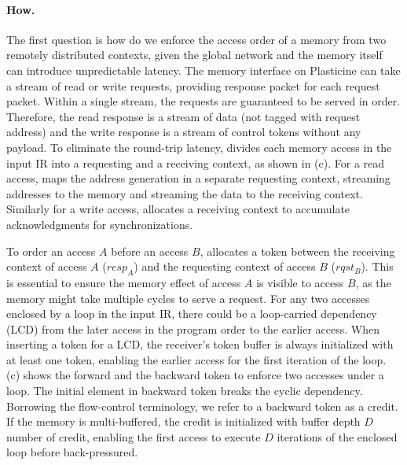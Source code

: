 
\paragraph{How.} 
The first question is how do we enforce the access order of a memory from two remotely distributed contexts, given the
global network and the memory itself can introduce unpredictable latency.
The memory interface on Plasticine can take a stream of read or write requests, providing response
packet for each request packet.
Within a single stream, the requests are guaranteed to be served in order. 
Therefore, the read response is a stream of data (not tagged with request address) and the write 
response is a stream of control tokens without any payload.
To eliminate the round-trip latency, \name divides each memory access in the input IR into 
a requesting and a receiving context, as shown in  (c). 
For a read access, \name maps the address generation in a separate requesting context, streaming
addresses to the memory and streaming the data to the receiving context.
Similarly for a write access, \name allocates a receiving context to accumulate acknowledgments 
for synchronizations.

To order an access $A$ before an access $B$,
\name allocates a token between the receiving context of access $A$ ($resp_A$) and the requesting context
of access $B$ ($rqst_B$).
This is essential to ensure the memory effect of access $A$ is visible to access $B$, as the memory
might take multiple cycles to serve a request.
For any two accesses enclosed by a loop in the input IR, there could be a loop-carried dependency (LCD) from
the later access in the program order to the earlier access.
When inserting a token for a LCD, the receiver's token buffer is always initialized with at least one token,
enabling the earlier access for the first iteration of the loop.  (c) shows the
forward and the backward token to enforce two accesses under a loop. The initial element in backward
token breaks the cyclic dependency. 
Borrowing the flow-control
terminology\cite{credit}, we refer to a backward token as a credit.
If the memory is multi-buffered, the credit is initialized with buffer depth $D$ number of credit, 
enabling the first access to execute $D$ iterations of the enclosed loop before back-pressured.


